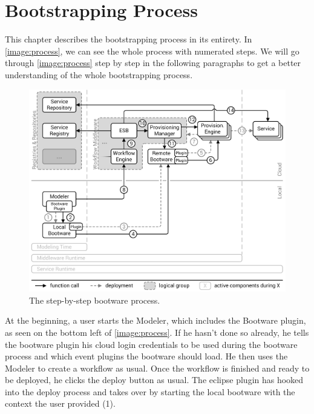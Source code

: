 \chapter{Bootstrapping Process}
\label{process}

This chapter describes the bootstrapping process in its entirety.
In \autoref{image:process}, we can see the whole process with numerated steps.
We will go through \autoref{image:process} step by step in the following paragraphs to get a better understanding of the whole bootstrapping process.

\begin{figure}[!htbp]
	\centering
	\includegraphics[resolution=600]{process/assets/process}
	\caption{The step-by-step bootware process.}
	\label{image:process}
\end{figure}

At the beginning, a user starts the Modeler, which includes the Bootware plugin, as seen on the bottom left of \autoref{image:process}.
If he hasn't done so already, he tells the bootware plugin his cloud login credentials to be used during the bootware process and which event plugins the bootware should load.
He then uses the Modeler to create a workflow as usual.
Once the workflow is finished and ready to be deployed, he clicks the deploy button as usual.
The eclipse plugin has hooked into the deploy process and takes over by starting the local bootware with the context the user provided (1).

